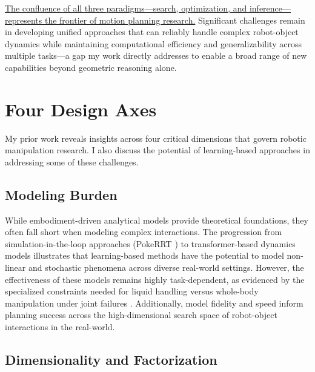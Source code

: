 \ul{The confluence of all three paradigms---search, optimization, and inference---represents the frontier of motion planning research.}
Significant challenges remain in developing unified approaches that can reliably handle complex robot-object dynamics while maintaining computational efficiency and generalizability across multiple tasks---a gap my work directly addresses to enable a broad range of new capabilities beyond geometric reasoning alone.

\section{Four Design Axes}
\label{sec:framework:axes}

My prior work reveals insights across four critical dimensions that govern robotic manipulation research. I also discuss the potential of learning-based approaches in addressing some of these challenges.

\subsection{Modeling Burden}
\label{sec:framework:modeling}

While embodiment-driven analytical models provide theoretical foundations, they often fall short when modeling complex interactions. The progression from simulation-in-the-loop approaches (PokeRRT \cite{pasricha2022pokerrt}) to transformer-based dynamics models \cite{reed2024transformer} illustrates that learning-based methods have the potential to model non-linear and stochastic phenomena across diverse real-world settings. However, the effectiveness of these models remains highly task-dependent, as evidenced by the specialized constraints needed for liquid handling \cite{abderezaei2024clutter} versus whole-body manipulation under joint failures \cite{briscoe2024exploring}. Additionally, model fidelity and speed inform planning success across the high-dimensional search space of robot-object interactions in the real-world.

\subsection{Dimensionality and Factorization}
\label{sec:framework:dimensionality}

